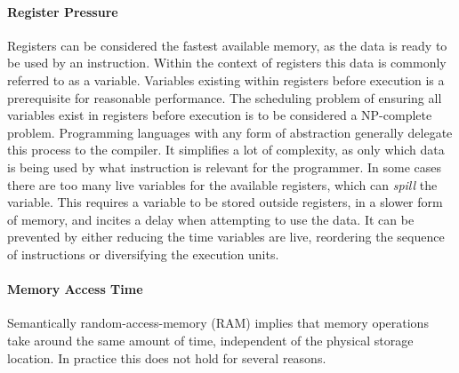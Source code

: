 \documentclass{article}
\begin{document}
\newpage

\paragraph{Register Pressure} 

Registers can be considered the fastest available memory, as the data is ready to be used by an instruction.
Within the context of registers this data is commonly referred to as a variable.
Variables existing within registers before execution is a prerequisite for reasonable performance.
The scheduling problem of ensuring all variables exist in registers before execution is to be considered a NP-complete problem\cite{register-allocation}.
Programming languages with any form of abstraction generally delegate this process to the compiler.
It simplifies a lot of complexity, as only which data is being used by what instruction is relevant for the programmer.
In some cases there are too many live variables for the available registers, which can {\it spill} the variable.
This requires a variable to be stored outside registers, in a slower form of memory, and incites a delay when attempting to use the data.
It can be prevented by either reducing the time variables are live, reordering the sequence of instructions or diversifying the execution units.  

\paragraph{Memory Access Time}

Semantically random-access-memory (RAM) implies that memory operations take around the same amount of time, independent of the physical storage location.
In practice this does not hold for several reasons.
\end{document}
